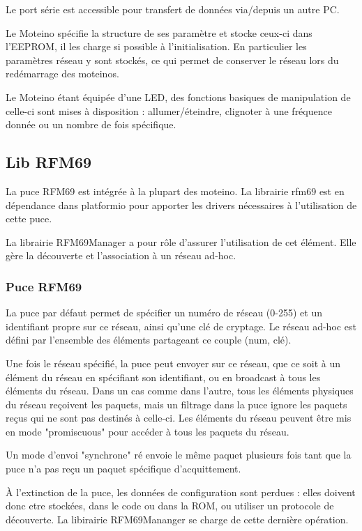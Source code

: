 \documentclass{report}
\begin{document}
Le port série est accessible pour transfert de données via/depuis un autre PC.

Le Moteino spécifie la structure de ses paramètre et stocke ceux-ci dans l'EEPROM, il les charge si possible à l'initialisation. En particulier les paramètres réseau y sont stockés, ce qui permet de conserver le réseau lors du redémarrage des moteinos.

Le Moteino étant équipée d'une LED, des fonctions basiques de manipulation de celle-ci sont mises à disposition : allumer/éteindre, clignoter à une fréquence donnée ou un nombre de fois spécifique.

\subsection{Lib RFM69}

La puce RFM69 est intégrée à la plupart des moteino. La librairie rfm69 est en dépendance dans platformio pour apporter les drivers nécessaires à l'utilisation de cette puce.

La librairie RFM69Manager a pour rôle d'assurer l'utilisation de cet élément. Elle  gère la découverte et l'association à un réseau ad-hoc.

\subsubsection{Puce RFM69}

La puce par défaut permet de spécifier un numéro de réseau (0-255) et un identifiant propre sur ce réseau, ainsi qu'une clé de cryptage. Le réseau ad-hoc est défini par l'ensemble des éléments partageant ce couple (num, clé).

Une fois le réseau spécifié, la puce peut envoyer sur ce réseau, que ce soit à un élément du réseau en spécifiant son identifiant, ou en broadcast à tous les éléments du réseau. Dans un cas comme dans l'autre, tous les éléments physiques du réseau reçoivent les paquets, mais un filtrage dans la puce ignore les paquets reçus qui ne sont pas destinés à celle-ci. Les éléments du réseau peuvent être mis en mode "promiscuous" pour accéder à tous les paquets du réseau.

Un mode d'envoi "synchrone" ré envoie le même paquet plusieurs fois tant que la puce n'a pas reçu un paquet spécifique d'acquittement.

À l'extinction de la puce, les données de configuration sont perdues : elles doivent donc etre stockées, dans le code ou dans la ROM, ou utiliser un protocole de découverte. La libirairie RFM69Mananger se charge de cette dernière opération.
\end{document}
